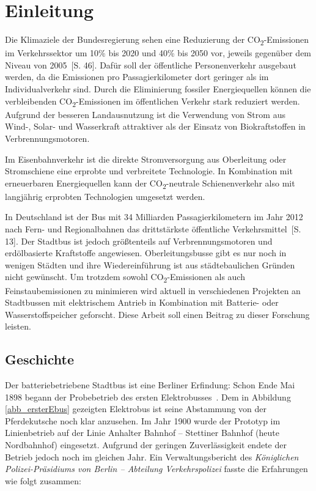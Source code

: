 \chapter{Einleitung}
Die Klimaziele der Bundesregierung sehen eine Reduzierung der CO\textsubscript{2}-Emissionen im Verkehrssektor um 10\% bis 2020 und 40\% bis 2050 vor, jeweils gegenüber dem Niveau von 2005~\cite{BMUB-Referat-KI-I-1:2014}[S. 46]. Dafür soll der öffentliche Personenverkehr ausgebaut werden, da die Emissionen pro Passagierkilometer dort geringer als im Individualverkehr sind. Durch die Eliminierung fossiler Energiequellen können die verbleibenden CO\textsubscript{2}-Emissionen im öffentlichen Verkehr stark reduziert werden. Aufgrund der besseren Landausnutzung ist die Verwendung von Strom aus Wind-, Solar- und Wasserkraft attraktiver als der Einsatz von Biokraftstoffen in Verbrennungsmotoren.

Im Eisenbahnverkehr ist die direkte Stromversorgung aus Oberleitung oder Stromschiene eine erprobte und verbreitete Technologie. In Kombination mit erneuerbaren Energiequellen kann der CO\textsubscript{2}-neutrale Schienenverkehr also mit langjährig erprobten Technologien umgesetzt werden.

In Deutschland ist der Bus mit 34 Milliarden Passagierkilometern im Jahr 2012 nach Fern- und Regionalbahnen das drittstärkste öffentliche Verkehrsmittel~\cite{Verband-Deutscher-Verkehrsunternehmen:2013}[S. 13]. Der Stadtbus ist jedoch größtenteils auf Verbrennungsmotoren und erdölbasierte Kraftstoffe angewiesen. Oberleitungsbusse gibt es nur noch in wenigen Städten und ihre Wiedereinführung ist aus städtebaulichen Gründen nicht gewünscht. Um trotzdem sowohl CO\textsubscript{2}-Emissionen als auch Feinstaubemissionen zu minimieren wird aktuell in verschiedenen Projekten an Stadtbussen mit elektrischem Antrieb in Kombination mit Batterie- oder Wasserstoffspeicher geforscht. Diese Arbeit soll einen Beitrag zu dieser Forschung leisten.

\section{Geschichte}
\label{abs_geschichte}


Der batteriebetriebene Stadtbus ist eine Berliner Erfindung: Schon Ende Mai 1898 begann der Probebetrieb des ersten Elektrobusses~\cite{Risch:1957}. Dem in Abbildung \ref{abb_ersterEbus} gezeigten Elektrobus ist seine Abstammung von der Pferdekutsche noch klar anzusehen.  Im Jahr 1900 wurde der Prototyp im Linienbetrieb auf der Linie Anhalter Bahnhof – Stettiner Bahnhof (heute Nordbahnhof) eingesetzt. Aufgrund der geringen Zuverlässigkeit endete der Betrieb jedoch noch im gleichen Jahr. Ein Verwaltungsbericht des \emph{Königlichen Polizei-Präsidiums von Berlin – Abteilung Verkehrspolizei} fasste die Erfahrungen wie folgt zusammen:

